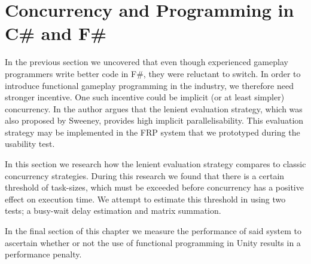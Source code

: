 \chapter{Concurrency and Programming in C\# and F\#}
In the previous section we uncovered that even though experienced gameplay programmers write better code in F\#, they were reluctant to switch. In order to introduce functional gameplay programming in the industry, we therefore need stronger incentive. One such incentive could be implicit (or at least simpler) concurrency. In \cite{DBLP:journals/cl/Tremblay-parallel} the author argues that the lenient evaluation strategy, which was also proposed by Sweeney, provides high implicit parallelisability. This evaluation strategy may be implemented in the \gls{FRP} system that we prototyped during the usability test.

In this section we research how the lenient evaluation strategy compares to classic concurrency strategies. During this research we found that there is a certain threshold of task-sizes, which must be exceeded before concurrency has a positive effect on execution time. We attempt to estimate this threshold in  using two tests; a busy-wait delay estimation and matrix summation.

In the final section of this chapter we measure the performance of said system to ascertain whether or not the use of functional programming in Unity results in a performance penalty. 




